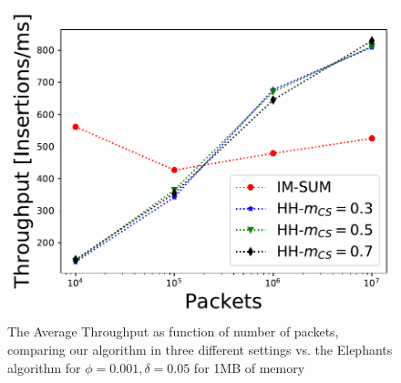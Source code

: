 \begin{figure}
    \includegraphics[width=\linewidth]{HH/figures/throughput_per_pkts_m=1.0.pdf}
    \caption[Average Throughput for 1MB of memory]{The Average Throughput as function of number of packets, comparing our algorithm in three different settings vs. the Elephants algorithm for $\phi=0.001,\delta=0.05$ for 1MB of memory}
    \label{fig:fig4_f}
\end{figure}